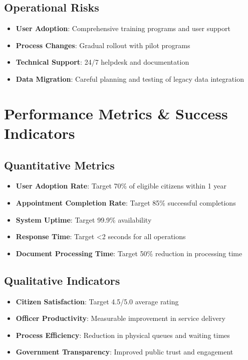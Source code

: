 \documentclass[11pt,a4paper]{article}
\begin{document}
\subsection{Operational Risks}

\begin{itemize}
    \item \textbf{User Adoption}: Comprehensive training programs and user support
    \item \textbf{Process Changes}: Gradual rollout with pilot programs
    \item \textbf{Technical Support}: 24/7 helpdesk and documentation
    \item \textbf{Data Migration}: Careful planning and testing of legacy data integration
\end{itemize}

\section{Performance Metrics \& Success Indicators}

\subsection{Quantitative Metrics}

\begin{itemize}
    \item \textbf{User Adoption Rate}: Target 70\% of eligible citizens within 1 year
    \item \textbf{Appointment Completion Rate}: Target 85\% successful completions
    \item \textbf{System Uptime}: Target 99.9\% availability
    \item \textbf{Response Time}: Target <2 seconds for all operations
    \item \textbf{Document Processing Time}: Target 50\% reduction in processing time
\end{itemize}

\subsection{Qualitative Indicators}

\begin{itemize}
    \item \textbf{Citizen Satisfaction}: Target 4.5/5.0 average rating
    \item \textbf{Officer Productivity}: Measurable improvement in service delivery
    \item \textbf{Process Efficiency}: Reduction in physical queues and waiting times
    \item \textbf{Government Transparency}: Improved public trust and engagement
\end{itemize}
\end{document}
